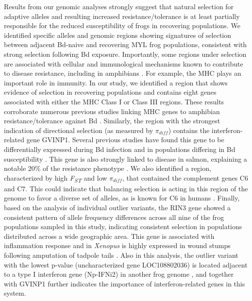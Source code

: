 \documentclass[9pt,twocolumn,twoside,lineno]{pnas-new}
\begin{document}
Results from our genomic analyses strongly suggest that natural
selection for adaptive alleles and resulting increased
resistance/tolerance is at least partially responsible for the reduced
susceptibility of frogs in recovering populations. We identified
specific alleles and genomic regions showing signatures of selection
between adjacent Bd-naive and recovering MYL frog populations,
consistent with strong selection following Bd exposure. Importantly,
some regions under selection are associated with cellular and
immunological mechanisms known to contribute to disease resistance,
including in amphibians \citep{zamudio2020}. For example, the MHC plays
an important role in immunity. In our study, we identified a region that
shows evidence of selection in recovering populations and contains eight
genes associated with either the MHC Class I or Class III regions. These
results corroborate numerous previous studies linking MHC genes to
amphibian resistance/tolerance against Bd
\citep[e.g.,][]{savage2011, bataille2015}. Similarly, the region with
the strongest indication of directional selection (as measured by
\(\pi_{diff}\)) contains the interferon-related gene GVINP1. Several
previous studies have found this gene to be differentially expressed
during Bd infection \citep[e.g.,][]{grogan2018, ellison2014} and in
populations differing in Bd susceptibility \citep{grogan2018}. This gene
is also strongly linked to disease in salmon, explaining a notable 20\%
of the resistance phenotype \citep{robledo2020, robledo2018}. We also
identified a region, characterized by high \emph{F\textsubscript{ST}}
and low \(\pi_{diff}\), that contained the complement genes C6 and C7.
This could indicate that balancing selection is acting in this region of
the genome to favor a diverse set of alleles, as is known for C6 in
humans \citep{soejima2005}. Finally, based on the analysis of individual
outlier variants, the RIN3 gene showed a consistent pattern of allele
frequency differences across all nine of the frog populations sampled in
this study, indicating consistent selection in populations distributed
across a wide geographic area. This gene is associated with inflammation
response and in \emph{Xenopus} is highly expressed in wound stumps
following amputation of tadpole tails \citep{fukazawa2009}. Also in this
analysis, the outlier variant with the lowest p-value (uncharacterized
gene LOC108802036) is located adjacent to a type I interferon gene
(Np-IFNi2) in another frog genome \citep{gan2018}, and together with
GVINP1 further indicates the importance of interferon-related genes in
this system.
\end{document}
